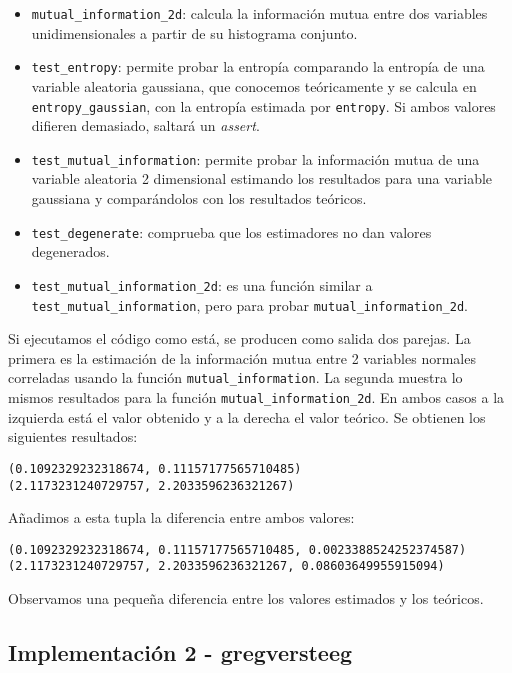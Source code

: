 \documentclass[10pt,a4paper]{article} %
\theoremstyle{definition}
\begin{document}
\begin{itemize}
\item \texttt{mutual\_information\_2d}: calcula la información mutua entre dos variables unidimensionales a partir de su histograma conjunto. 

\item \texttt{test\_entropy}: permite probar la entropía comparando la entropía de una variable aleatoria gaussiana, que conocemos teóricamente y se calcula en \texttt{entropy\_gaussian}, con la entropía estimada por \texttt{entropy}. Si ambos valores difieren demasiado, saltará un \textit{assert}.

\item \texttt{test\_mutual\_information}: permite probar la información mutua de una variable aleatoria 2 dimensional estimando los resultados para una variable gaussiana y comparándolos con los resultados teóricos.

\item \texttt{test\_degenerate}: comprueba que los estimadores no dan valores degenerados.

\item \texttt{test\_mutual\_information\_2d}: es una función similar a \texttt{test\_mutual\_information}, pero para probar \texttt{mutual\_information\_2d}.
\end{itemize} 

Si ejecutamos el código como está, se producen como salida dos parejas. La primera es la estimación de la información mutua entre 2 variables normales correladas usando la función \texttt{mutual\_information}. La segunda muestra lo mismos resultados para la función \texttt{mutual\_information\_2d}. En ambos casos a la izquierda está el valor obtenido y a la derecha el valor teórico. Se obtienen los siguientes resultados:
\begin{lstlisting}
(0.1092329232318674, 0.11157177565710485)
(2.1173231240729757, 2.2033596236321267)
\end{lstlisting}

Añadimos a esta tupla la diferencia entre ambos valores:
\begin{lstlisting}
(0.1092329232318674, 0.11157177565710485, 0.0023388524252374587)
(2.1173231240729757, 2.2033596236321267, 0.08603649955915094)
\end{lstlisting}

Observamos una pequeña diferencia entre los valores estimados y los teóricos.

\subsection{Implementación 2 -  gregversteeg}
\end{document}
